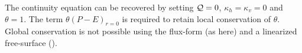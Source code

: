 The continuity equation can be recovered by setting ${\cal Q}=0$, $\kappa_h = \kappa_v = 0$ and
$\theta=1$. The term $\theta (P-E)_{r=0}$ is required to retain local
conservation of $\theta$. Global conservation is not possible using
the flux-form (as here) and a linearized free-surface
(\cite{Griffies00,Campin02}).




